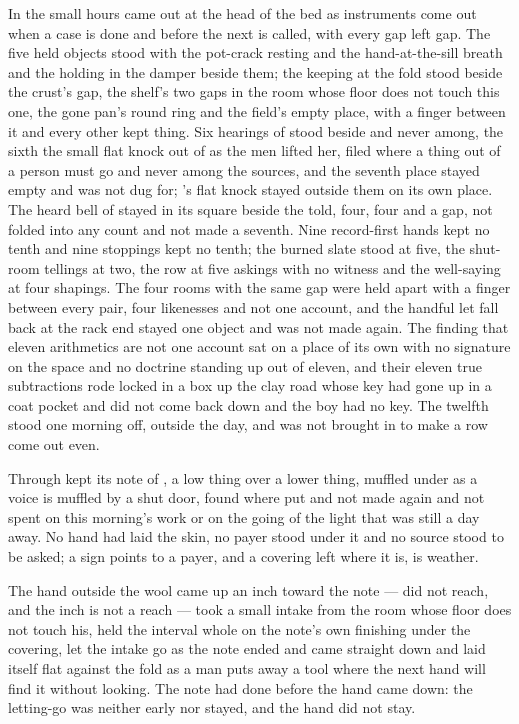 In the small hours  came out at the head of the bed as instruments come out when a case is done and before the next is called, with every gap left gap. The five held objects stood with the pot-crack resting and the hand-at-the-sill breath and the holding in the damper beside them; the keeping at the fold stood beside the crust's gap, the shelf's two gaps in the room whose floor does not touch this one, the gone pan's round ring and the field's empty place, with a finger between it and every other kept thing. Six hearings of  stood beside and never among, the sixth the small flat knock out of  as the men lifted her, filed where a thing out of a person must go and never among the sources, and the seventh place stayed empty and was not dug for; 's flat knock stayed outside them on its own place. The heard bell of  stayed in its square beside the told, four, four and a gap, not folded into any count and not made a seventh. Nine record-first hands kept no tenth and nine stoppings kept no tenth; the burned slate stood at five, the shut-room tellings at two, the row at five askings with no witness and the well-saying at four shapings. The four rooms with the same gap were held apart with a finger between every pair, four likenesses and not one account, and the handful let fall back at the rack end stayed one object and was not made again. The finding that eleven arithmetics are not one account sat on a place of its own with no signature on the space and no doctrine standing up out of eleven, and their eleven true subtractions rode locked in a box up the clay road whose key had gone up in a coat pocket and did not come back down and the boy had no key. The twelfth stood one morning off, outside the day, and was not brought in to make a row come out even.

Through   kept its note of , a low thing over a lower thing, muffled under  as a voice is muffled by a shut door, found where put and not made again and not spent on this morning's work or on the going of the light that was still a day away. No hand had laid the skin, no payer stood under it and no source stood to be asked; a sign points to a payer, and a covering left where it is, is weather.

The hand outside the wool came up an inch toward the note --- did not reach, and the inch is not a reach --- took a small intake from the room whose floor does not touch his, held the interval whole on the note's own finishing under the covering, let the intake go as the note ended and came straight down and laid itself flat against the fold as a man puts away a tool where the next hand will find it without looking. The note had done before the hand came down: the letting-go was neither early nor stayed, and the hand did not stay.

